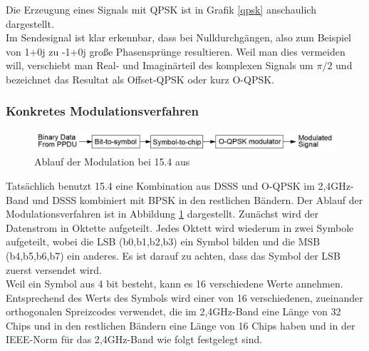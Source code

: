 Die Erzeugung eines Signals mit QPSK ist in Grafik \ref{qpsk} anschaulich dargestellt.\\
Im Sendesignal ist klar erkennbar, dass bei Nulldurchgängen, also zum Beispiel von 1+0j zu -1+0j große Phasensprünge resultieren. Weil man dies vermeiden will, verschiebt man Real- und Imaginärteil des komplexen Signals um $\pi/2$ und bezeichnet das Resultat als Offset-QPSK oder kurz O-QPSK.\\

\subsubsection{Konkretes Modulationsverfahren}
\begin{figure}
	\centering
	\includegraphics[width=\textwidth]{Grafiken-Alex/modulation.jpg}
	\caption{Ablauf der Modulation bei 15.4 aus \cite[S.412]{ieee154}}
	\label{modulation}
\end{figure}
Tatsächlich benutzt 15.4 eine Kombination aus DSSS und O-QPSK im 2,4GHz-Band und DSSS kombiniert mit BPSK in den restlichen Bändern. Der Ablauf der Modulationsverfahren ist in Abbildung \ref{modulation} dargestellt. Zunächst wird der Datenstrom in Oktette aufgeteilt. Jedes Oktett wird wiederum in zwei Symbole aufgeteilt, wobei die LSB (b0,b1,b2,b3) ein Symbol bilden und die MSB (b4,b5,b6,b7) ein anderes. Es ist darauf zu achten, dass das Symbol der LSB zuerst versendet wird.\\
Weil ein Symbol aus 4 bit besteht, kann es 16 verschiedene Werte annehmen. Entsprechend des Werts des Symbols wird einer von 16 verschiedenen, zueinander orthogonalen Spreizcodes verwendet, die im 2,4GHz-Band eine Länge von 32 Chips und in den restlichen Bändern eine Länge von 16 Chips haben und in der IEEE-Norm für das 2,4GHz-Band wie folgt festgelegt sind.\cite[S.413]{ieee154}\\
